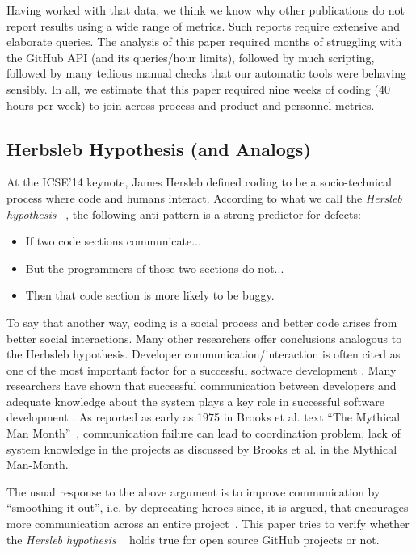 \documentclass[smallextended]{svjour3}
\newcommand{\bi}{\begin{itemize}}
\newcommand{\ei}{\end{itemize}}
\begin{document}
Having worked with that data, we think we know why other publications do not report results using a wide range of metrics. Such reports
require extensive and elaborate queries.
 The analysis of this paper required
months of struggling with the GitHub API (and its queries/hour limits), followed by much   scripting, followed by many tedious manual checks that our automatic tools were behaving sensibly. In all, we estimate that this paper required nine weeks of coding (40 hours per week) to join across
process and product and personnel metrics.

\subsection{Herbsleb Hypothesis (and Analogs)}
At the ICSE'14 keynote, James Hersleb defined coding to be a socio-technical
process where code and humans interact. According to what we call  the { \em Hersleb hypothesis} ~\cite{Herbsleb:2014},
the following anti-pattern is a strong predictor for defects:
\bi
\item
 If two code sections communicate...
 \item
But the programmers of those two sections do not...
\item
Then that code section is more likely to be buggy.
\ei
To say that another way,  coding is a social process and better code arises from better social interactions. Many other researchers offer conclusions analogous to the Herbsleb hypothesis.
 Developer communication/interaction is often cited as one of the most important factor for a successful software development \cite{Agile_software_development,Kraut:1995:CSD:203330.203345,1205177}. Many researchers have shown that successful communication between developers and adequate knowledge about the system plays a key role in successful software development \cite{TESCH2009657,Girba,841783}. As reported as early as 1975 in Brooks et al.  text ``The Mythical Man Month''~\cite{brooks1995mythical},
 communication failure can lead to coordination problem, lack of system knowledge in the projects as discussed by Brooks et al. in the Mythical Man-Month.

The usual response to the above argument is to improve communication by ``smoothing it out'', i.e. by deprecating
heroes since, it is argued,  that encourages more communication across an entire project~\cite{bier2011online,boehm2006view,hislop2002integrating,morcovcomplex,wood2005multiview}. 
This paper tries to verify whether the { \em Hersleb hypothesis} ~\cite{Herbsleb:2014} holds true for open source GitHub projects or not.
\end{document}
